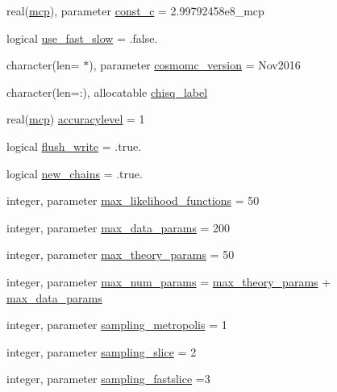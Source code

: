 \begin{DoxyCompactItemize}
\item 
real(\mbox{\hyperlink{namespacesettings_a341fa0fe410054f78630c33e118669bf}{mcp}}), parameter \mbox{\hyperlink{namespacesettings_a9aec23a6e1d47760b93c79084ddacd3c}{const\+\_\+c}} = 2.\+99792458e8\+\_\+mcp
\item 
logical \mbox{\hyperlink{namespacesettings_ae20cda2e95f0e537dcbca3b63cb9bb0f}{use\+\_\+fast\+\_\+slow}} = .false.
\item 
character(len= $\ast$), parameter \mbox{\hyperlink{namespacesettings_a572023d0201bee3f5560de0fdc96dc4e}{cosmomc\+\_\+version}} = \textquotesingle{}Nov2016\textquotesingle{}
\item 
character(len=\+:), allocatable \mbox{\hyperlink{namespacesettings_a493eb241cf271ca0ba4da755bc6b13d1}{chisq\+\_\+label}}
\item 
real(\mbox{\hyperlink{namespacesettings_a341fa0fe410054f78630c33e118669bf}{mcp}}) \mbox{\hyperlink{namespacesettings_a815a186f7293c7e58833ae29fee76454}{accuracylevel}} = 1
\item 
logical \mbox{\hyperlink{namespacesettings_ae38825eb811eae327d68db37b75023aa}{flush\+\_\+write}} = .true.
\item 
logical \mbox{\hyperlink{namespacesettings_ac176aa2a57ff28bd3d05a0a2f2b4defa}{new\+\_\+chains}} = .true.
\item 
integer, parameter \mbox{\hyperlink{namespacesettings_a23df6252cfd71721b764c455de43905a}{max\+\_\+likelihood\+\_\+functions}} = 50
\item 
integer, parameter \mbox{\hyperlink{namespacesettings_a4d2d308b7b3d47f91cd40d6c735b4d99}{max\+\_\+data\+\_\+params}} = 200
\item 
integer, parameter \mbox{\hyperlink{namespacesettings_a7884cd47680ca4079d2177f93eb41772}{max\+\_\+theory\+\_\+params}} = 50
\item 
integer, parameter \mbox{\hyperlink{namespacesettings_ab891b6a835eb8706eb0477db68a2c351}{max\+\_\+num\+\_\+params}} = \mbox{\hyperlink{namespacesettings_a7884cd47680ca4079d2177f93eb41772}{max\+\_\+theory\+\_\+params}} + \mbox{\hyperlink{namespacesettings_a4d2d308b7b3d47f91cd40d6c735b4d99}{max\+\_\+data\+\_\+params}}
\item 
integer, parameter \mbox{\hyperlink{namespacesettings_a7fbe5e0e8194b33c8990365eafe20bed}{sampling\+\_\+metropolis}} = 1
\item 
integer, parameter \mbox{\hyperlink{namespacesettings_a3122cb465205f6e3dfbcca05cd8c4d0c}{sampling\+\_\+slice}} = 2
\item 
integer, parameter \mbox{\hyperlink{namespacesettings_af8673aadd88b8cfe802aeb29376ec2a6}{sampling\+\_\+fastslice}} =3

\end{DoxyCompactItemize}
